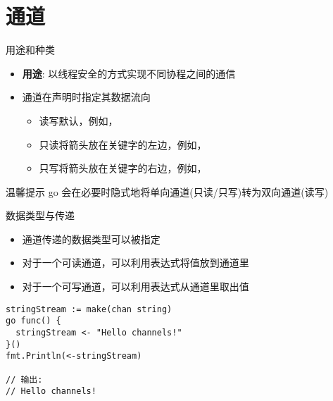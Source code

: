 \section{通道\channel }
\begin{frame}{用途和种类}
    \begin{itemize}
        \item \textbf{用途}: 以线程安全的方式实现不同协程之间的通信 
        \item 通道在声明时指定其数据流向
            \begin{itemize}
                \item \alert{读写}\quad 默认，例如，
                \item \alert{只读}\quad 将\code{<-}箭头放在关键字的左边，例如，
                \item \alert{只写}\quad 将\code{<-}箭头放在关键字的右边，例如，
            \end{itemize}
    \end{itemize}

    \pause
    \begin{exampleblock}{温馨提示}
        go 会在必要时隐式地将单向通道(只读/只写)转为双向通道(读写) 
    \end{exampleblock}
\end{frame}

\begin{frame}[fragile]{数据类型与传递}
    \begin{itemize}
        \item 通道传递的数据类型可以被指定
        \item 对于一个可读通道，可以利用表达式将值放到通道里
        \item 对于一个可写通道，可以利用表达式从通道里取出值
    \end{itemize}
\begin{lstlisting}[caption={通道数据传递样例}]
stringStream := make(chan string)
go func() {
  stringStream <- "Hello channels!"
}()
fmt.Println(<-stringStream)

// 输出:
// Hello channels!    
\end{lstlisting}    
\end{frame}

